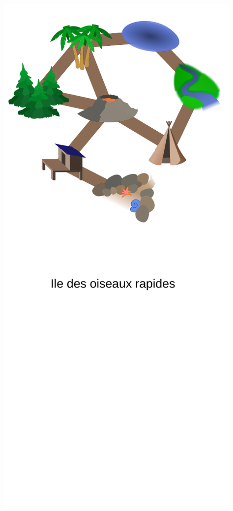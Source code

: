 \documentclass[french, landscape]{article}
\begin{document}
\newpage\includegraphics[height=\textheight]{iles/svgs/logique/5_oiseaux-rapides.pdf}
\end{document}
